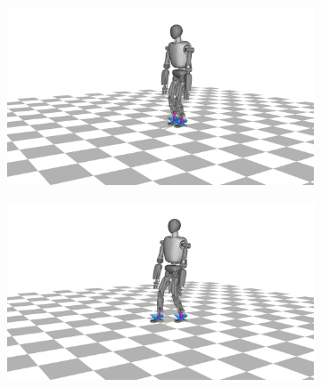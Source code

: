 \begin{figure}[h!]
\begin{subfigure}{.5\textwidth}
	\includegraphics[width=1\linewidth]{fig/walkDynamic/snaps/1}
	\end{subfigure}%
\begin{subfigure}{.5\textwidth}
	\includegraphics[width=1\linewidth]{fig/walkDynamic/snaps/4}
\end{subfigure}%


\end{figure}

